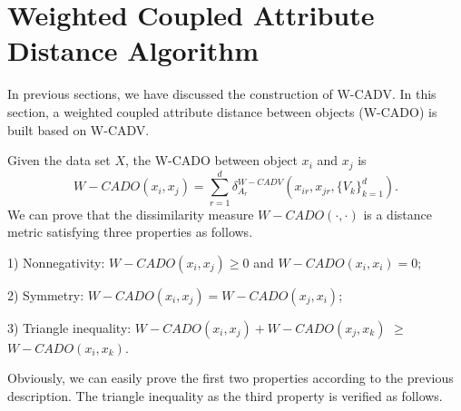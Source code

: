 \documentclass[review]{elsarticle}
\begin{document}
\section{Weighted Coupled Attribute Distance Algorithm}
In previous sections, we have discussed the construction of W-CADV. In this section, a weighted coupled attribute distance between objects (W-CADO) is built based on W-CADV.

Given the data set $X$, the W-CADO between object $x_i$ and $x_j$ is
\begin{equation}
W-CADO(x_i,x_j) = \sum_{r=1}^{d}\delta_{A_r}^{W-CADV}(x_{ir},x_{jr},\{V_k\}_{k = 1} ^ d)
\label{equ23}.
\end{equation}
We can prove that the dissimilarity measure $W-CADO(\cdot,\cdot)$ is a distance metric satisfying three properties as follows.

1) Nonnegativity: $W-CADO(x_i,x_j) \geq 0$ and $W-CADO(x_i,x_i) = 0$;

2) Symmetry: $W-CADO(x_i,x_j) = W-CADO(x_j,x_i)$;

3) Triangle inequality: $W-CADO(x_i,x_j) + W-CADO(x_j,x_k)$ $\geq$ $W-CADO(x_i,x_k)$.

Obviously, we can easily prove the first two properties according to the previous description. The triangle inequality as the third property is verified as follows.
\end{document}
